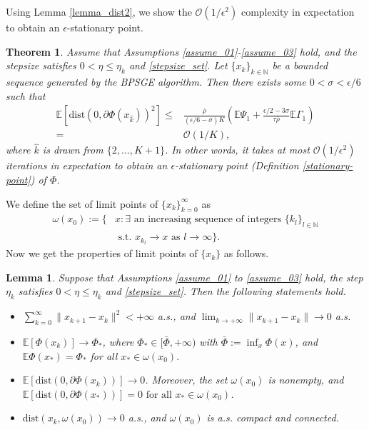 \documentclass[letterpaper]{article} %
\newtheorem{theorem}{Theorem}
\newtheorem{lemma}{Lemma}
\begin{document}
	Using Lemma \ref{lemma_dist2}, we show the $\mathcal{O}(1/\epsilon^{2})$ complexity  in expectation  to obtain an $\epsilon$-stationary point. 
	\begin{theorem}\label{subgradient_rate}
		Assume that Assumptions \ref{assume_01}-\ref{assume_03} hold, and the stepsize satisfies $0<\eta\le\eta_{k}$ and \eqref{stepsize_set}.  Let $\{x_{k}\}_{k\in\mathbb{N}}$ be a bounded sequence generated by the BPSGE algorithm. Then there exists  some $0<\sigma<\epsilon/6$ such that
		\begin{align*}
			\mathbb{E}[\mathrm{dist}(0,\partial\Phi(x_{\hat{k}}))^{2}]\le& \frac{\bar{\rho}}{(\epsilon/6-\sigma)K}(\mathbb{E}\Psi_{1}+\frac{\epsilon/2-3\sigma}{\tau\bar{\rho}}\mathbb{E}\Gamma_{1})\\
			=&\mathcal{O}(1/K),
		\end{align*}
		where $\hat{k}$ is drawn from $\{2, \dots, K+1\}$. In other words, it takes at most $\mathcal{O}(1/\epsilon^{2})$ iterations  in expectation  to obtain an $\epsilon$-stationary point (Definition \ref{stationary-point}) of $\Phi$. 
	\end{theorem}
	
	We define the set of limit points of $\{x_{k}\}_{k=0}^{\infty}$ as
	\begin{align*}
		\omega(x_{0}):=\{&x: \exists \text{ an increasing sequence of integers } \{k_{l}\}_{l\in\mathbb{N}}\\
		&\text{ s.t. } x_{k_{l}}\rightarrow x\text{ as } l\rightarrow \infty\}. 
	\end{align*}
	Now we get the properties of limit points of $\{x_{k}\}$ as follows. 
	\begin{lemma}\label{statements_lemma}
		Suppose that Assumptions \ref{assume_01} to \ref{assume_03} hold,   the step $\eta_{k}$ satisfies $0<\eta\le \eta_{k}$ and \eqref{stepsize_set}.  Then the following statements hold. 
		\begin{itemize}
			\item $\sum_{k=0}^{\infty}\|x_{k+1}-x_{k}\|^{2}<+\infty$ a.s., and $\lim_{k\rightarrow+\infty}\|x_{k+1}-x_{k}\|\rightarrow0$ a.s.
			\item $\mathbb{E}[\Phi(x_{k})]\rightarrow\Phi_{*}$, where $\Phi_{*}\in[\bar{\Phi},+\infty)$  with $\bar{\Phi}:=\inf_{x} \Phi(x)$, and $\mathbb{E}\Phi(x_{*})=\Phi_{*}$ for all $x_{*}\in\omega(x_{0})$.
			\item $\mathbb{E}[\text{dist}(0,\partial\Phi(x_{k}))]\rightarrow0$. Moreover, the set $\omega(x_{0})$ is nonempty, and $\mathbb{E}[\text{dist}(0,\partial\Phi(x_{*}))]=0 \text{ for all } x_{*}\in\omega(x_{0})$.
			\item $\text{dist}(x_{k},\omega(x_{0}))\rightarrow0$ a.s., and $\omega(x_{0})$ is a.s. compact and connected.
		\end{itemize}
	\end{lemma}	
	
\end{document}
